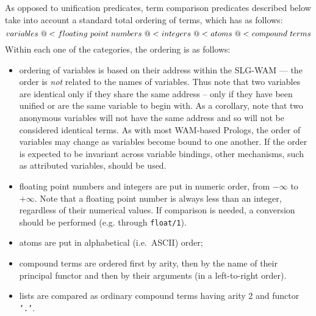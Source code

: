 As opposed to unification predicates, term comparison predicates
described below take into account a standard total ordering of terms,
which has as follows:
%
\[ 
variables \ {\tt @<} \ floating \ point \ numbers \ {\tt @<} \ integers \ {\tt @<} \ atoms \ {\tt @<} \ compound \ terms 
\] 
%
Within each one of the categories, the ordering is as follows:
\begin{itemize}
\item ordering of variables is based on their address within the
  SLG-WAM --- the order is {\em not\/} related to the names of
  variables.  Thus note that two variables are identical only if they
  share the same address -- only if they have been unified or are the
  same variable to begin with.  As a corollary, note that two
  anonymous variables will not have the same address and so will not
  be considered identical terms.  As with most WAM-based Prologs, the
  order of variables may change as variables become bound to one
  another.  If the order is expected to be invariant across variable
  bindings, other mechanisms, such as attributed variables, should be
  used.
\item floating point numbers and integers are put in numeric order,
  from $-\infty$ to $+\infty$.  Note that a floating point number is
  always less than an integer, regardless of their numerical values.
  If comparison is needed, a conversion should be performed
  (e.g. through {\tt float/1}).
\item	atoms are put in alphabetical (i.e.\ ASCII) order;
\item	compound terms are ordered first by arity, then by the name of their
	principal functor and then by their arguments (in a left-to-right 
	order).
\item	lists are compared as ordinary compound terms having arity 2 and 
	functor {\tt '.'}.
\end{itemize}

